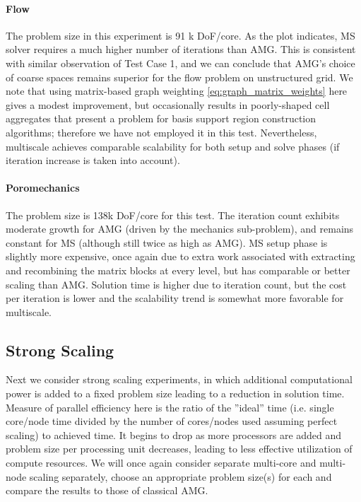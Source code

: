 \paragraph{Flow}
The problem size in this experiment is 91 k DoF/core.   As the plot indicates, MS solver requires a much higher number of iterations than AMG.   This is consistent with similar observation of Test Case 1, and we can conclude that AMG's choice of coarse spaces remains superior for the flow problem on unstructured grid.   We note that using matrix-based graph weighting \cref{eq:graph_matrix_weights} here gives a modest improvement, but occasionally results in poorly-shaped cell aggregates that present a problem for basis support region construction algorithms; therefore we have not employed it in this test.   Nevertheless, multiscale achieves comparable scalability for both setup and solve phases (if iteration increase is taken into account).

\paragraph{Poromechanics}
The problem size is 138k DoF/core for this test.   The iteration count exhibits moderate growth for AMG (driven by the mechanics sub-problem), and remains constant for MS (although still twice as high as AMG).   MS setup phase is slightly more expensive, once again due to extra work associated with extracting and recombining the matrix blocks at every level, but has comparable or better scaling than AMG.   Solution time is higher due to iteration count, but the cost per iteration is lower and the scalability trend is somewhat more favorable for multiscale.

\subsection{Strong Scaling}
\label{subsec:par_scaling_strong}

Next we consider strong scaling experiments, in which additional computational power is added to a fixed problem size leading to a reduction in solution time.   Measure of parallel efficiency here is the ratio of the ''ideal'' time (i.e. single core/node time divided by the number of cores/nodes used assuming perfect scaling) to achieved time.   It begins to drop as more processors are added and problem size per processing unit decreases, leading to less effective utilization of compute resources.    We will once again consider separate multi-core and multi-node scaling separately, choose an appropriate problem size(s) for each and compare the results to those of classical AMG.

